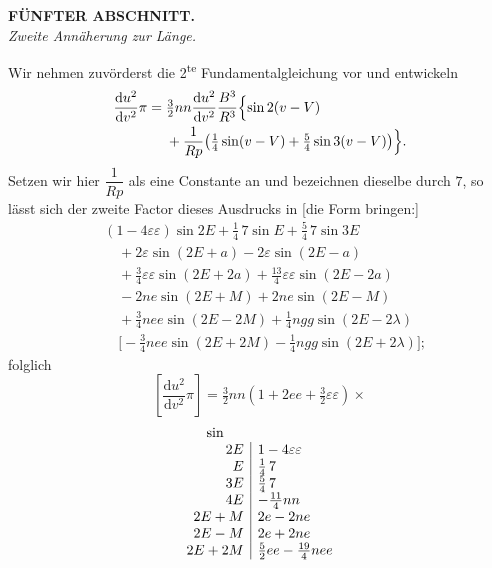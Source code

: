 \clearpage
\begingroup
{}
\renewcommand{\headrulewidth}{0pt}
\thispagestyle{VIIPrinted634}
\begin{center}
\textbf{FÜNFTER ABSCHNITT.}\\[8pt]
\textit{Zweite Annäherung zur Länge.}
\end{center}
\par\noindent\hspace*{\parindent}Wir nehmen zuvörderst die 2\textsuperscript{te} Fundamentalgleichung vor und entwickeln
\[
\begin{aligned}
\frac{\mathrm du^2}{\mathrm dv^2}\pi
={}&\tfrac32nn\frac{\mathrm du^2}{\mathrm dv^2}\frac{B^3}{R^3}
\Bigl\{\sin2(v-V)\\
&+\frac{1}{Rp}\bigl(\tfrac14\sin(v-V)+\tfrac54\sin3(v-V)\bigr)\Bigr\}.
\end{aligned}
\]
\noindent Setzen wir hier \(\dfrac{1}{Rp}\) als eine Constante an und bezeichnen dieselbe durch \(7\),
so lässt sich der zweite Factor dieses Ausdrucks in [die Form bringen:]
\[
\begin{aligned}
&(1-4\varepsilon\varepsilon)\sin2E+\tfrac14\,7\sin E+\tfrac54\,7\sin3E\\
&\quad+2\varepsilon\sin(2E+a)-2\varepsilon\sin(2E-a)\\
&\quad+\tfrac34\varepsilon\varepsilon\sin(2E+2a)+\tfrac{13}{4}\varepsilon\varepsilon\sin(2E-2a)\\
&\quad-2ne\sin(2E+M)+2ne\sin(2E-M)\\
&\quad+\tfrac34nee\sin(2E-2M)+\tfrac14ngg\sin(2E-2\lambda)\\
&\quad\bigl[-\tfrac34nee\sin(2E+2M)-\tfrac14ngg\sin(2E+2\lambda)\bigr];
\end{aligned}
\]
\noindent folglich
\[
\left[\frac{\mathrm du^2}{\mathrm dv^2}\pi\right]
=\tfrac32nn(1+2ee+\tfrac32\varepsilon\varepsilon)\times
\]
\[
\begin{array}{r|l}
\multicolumn{1}{c}{\sin}&\\
2E&1-4\varepsilon\varepsilon\\
E&\tfrac14\,7\\
3E&\tfrac54\,7\\
4E&-\tfrac{11}{4}nn\\
2E+M&2e-2ne\\
2E-M&2e+2ne\\
2E+2M&\tfrac52ee-\tfrac{19}{4}nee
\end{array}
\]
